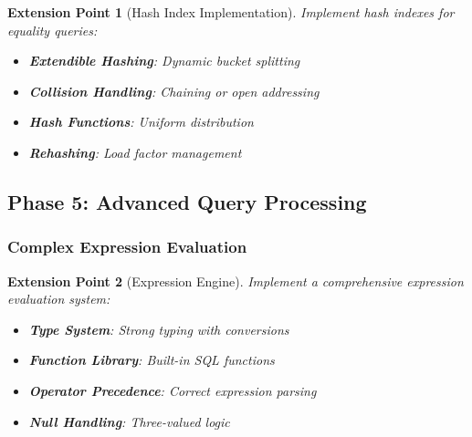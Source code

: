 \documentclass[12pt,a4paper]{article}
\newtheorem{extension}{Extension Point}[section]
\begin{document}
\begin{extension}[Hash Index Implementation]
Implement hash indexes for equality queries:

\begin{itemize}
    \item \textbf{Extendible Hashing}: Dynamic bucket splitting
    \item \textbf{Collision Handling}: Chaining or open addressing
    \item \textbf{Hash Functions}: Uniform distribution
    \item \textbf{Rehashing}: Load factor management
\end{itemize}
\end{extension}

\subsection{Phase 5: Advanced Query Processing}

\subsubsection{Complex Expression Evaluation}

\begin{extension}[Expression Engine]
Implement a comprehensive expression evaluation system:

\begin{itemize}
    \item \textbf{Type System}: Strong typing with conversions
    \item \textbf{Function Library}: Built-in SQL functions
    \item \textbf{Operator Precedence}: Correct expression parsing
    \item \textbf{Null Handling}: Three-valued logic
\end{itemize}
\end{extension}
\end{document}
